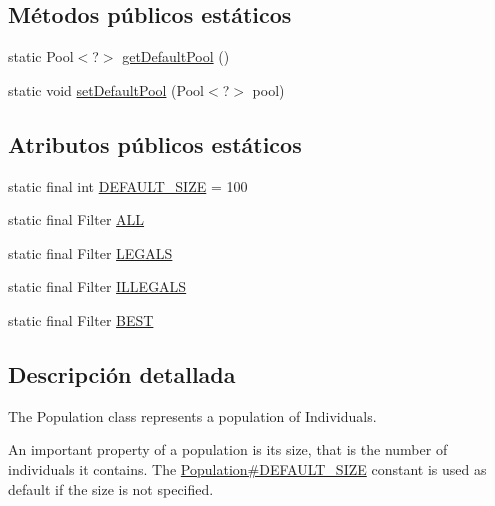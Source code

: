 \subsection*{Métodos públicos estáticos}
\begin{DoxyCompactItemize}
\item 
static Pool$<$?$>$ \hyperlink{classjenes_1_1population_1_1_population_3_01_t_01extends_01_chromosome_01_4_adf33dd4053815e1ec5e1f7026e2fef19}{get\-Default\-Pool} ()
\item 
static void \hyperlink{classjenes_1_1population_1_1_population_3_01_t_01extends_01_chromosome_01_4_a23696a2d226ab74e263d141b91864efd}{set\-Default\-Pool} (Pool$<$?$>$ pool)
\end{DoxyCompactItemize}
\subsection*{Atributos públicos estáticos}
\begin{DoxyCompactItemize}
\item 
static final int \hyperlink{classjenes_1_1population_1_1_population_3_01_t_01extends_01_chromosome_01_4_aada0b23838115e85378efcd67c1904e3}{D\-E\-F\-A\-U\-L\-T\-\_\-\-S\-I\-Z\-E} = 100
\item 
static final Filter \hyperlink{classjenes_1_1population_1_1_population_3_01_t_01extends_01_chromosome_01_4_a5cfea1b7e0a14171b85d3ae7460f0723}{A\-L\-L}
\item 
static final Filter \hyperlink{classjenes_1_1population_1_1_population_3_01_t_01extends_01_chromosome_01_4_a99a629869951da716c9efc8be2fdbb70}{L\-E\-G\-A\-L\-S}
\item 
static final Filter \hyperlink{classjenes_1_1population_1_1_population_3_01_t_01extends_01_chromosome_01_4_acbb46d951b86374304f72246d3142bce}{I\-L\-L\-E\-G\-A\-L\-S}
\item 
static final Filter \hyperlink{classjenes_1_1population_1_1_population_3_01_t_01extends_01_chromosome_01_4_abf7824fc3827456cc071a313586adf20}{B\-E\-S\-T}
\end{DoxyCompactItemize}


\subsection{Descripción detallada}
The Population class represents a population of {\ttfamily Individual}s. 

An important property of a population is its size, that is the number of individuals it contains. The \hyperlink{}{Population\#\-D\-E\-F\-A\-U\-L\-T\-\_\-\-S\-I\-Z\-E} constant is used as default if the size is not specified. 

